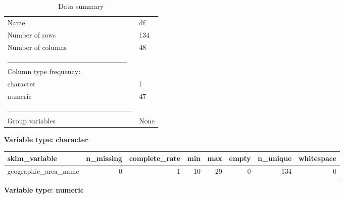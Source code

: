 \documentclass[
]{article}
\begin{document}
\begin{longtable}[]{@{}ll@{}}
\caption{Data summary}\tabularnewline
\toprule
\endhead
Name & df\tabularnewline
Number of rows & 134\tabularnewline
Number of columns & 48\tabularnewline
\_\_\_\_\_\_\_\_\_\_\_\_\_\_\_\_\_\_\_\_\_\_\_ &\tabularnewline
Column type frequency: &\tabularnewline
character & 1\tabularnewline
numeric & 47\tabularnewline
\_\_\_\_\_\_\_\_\_\_\_\_\_\_\_\_\_\_\_\_\_\_\_\_ &\tabularnewline
Group variables & None\tabularnewline
\bottomrule
\end{longtable}

\textbf{Variable type: character}

\begin{longtable}[]{@{}lrrrrrrr@{}}
\toprule
skim\_variable & n\_missing & complete\_rate & min & max & empty &
n\_unique & whitespace\tabularnewline
\midrule
\endhead
geographic\_area\_name & 0 & 1 & 10 & 29 & 0 & 134 & 0\tabularnewline
\bottomrule
\end{longtable}

\textbf{Variable type: numeric}
\end{document}
